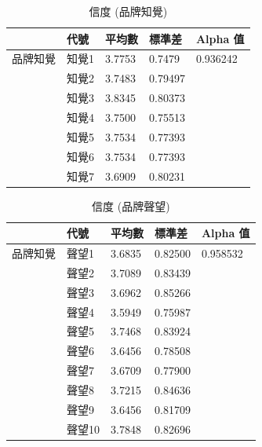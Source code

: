 \begin{table}[htb]
\caption{信度 (品牌知覺)}
\label{tab:e2}
\renewcommand{\arraystretch}{1.2} %
\arrayrulewidth=1pt               %
\tabcolsep=18pt                   %
\begin{tabular}[t]{lllll}  %
\hline
 & 代號& 平均數 & 標準差&  Alpha 值  \\
\hline
品牌知覺 & 知覺1  & 3.7753   & 0.7479  &0.936242 \\
              & 知覺2  & 3.7483  &0.79497  &  \\
             & 知覺3  & 3.8345    & 0.80373  &  \\
             & 知覺4 & 3.7500   &0.75513  &\\
             & 知覺5   & 3.7534  & 0.77393 &  \\
             & 知覺6  & 3.7534    &  0.77393 & \\
             & 知覺7  & 3.6909     & 0.80231  &  \\
\hline
\end{tabular}
\end{table}


\begin{table}[htb]
\caption{信度 (品牌聲望)}
\label{tab:e3}
\renewcommand{\arraystretch}{1.2} %
\arrayrulewidth=1pt               %
\tabcolsep=18pt                   %
\begin{tabular}[t]{lllll}  %
\hline
 & 代號& 平均數 & 標準差&  Alpha 值  \\
\hline
品牌知覺 & 聲望1  & 3.6835 &0.82500 &0.958532\\
              & 聲望2  & 3.7089 &0.83439 &  \\
             & 聲望3  &3.6962 &0.85266  &  \\
             & 聲望4  &3.5949&0.75987\\
             & 聲望5  & 3.7468 &0.83924 &  \\
             & 聲望6  & 3.6456&0.78508& \\
             & 聲望7  & 3.6709&0.77900  &  \\
             & 聲望8  & 3.7215&0.84636&  \\
             & 聲望9  &3.6456&0.81709&  \\
             & 聲望10  & 3.7848&0.82696 &  \\
\hline
\end{tabular}
\end{table}

